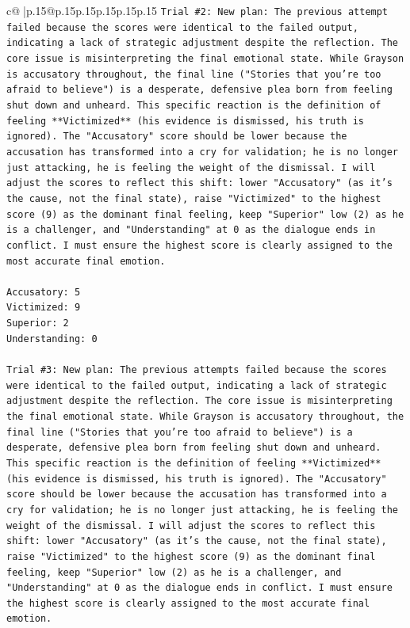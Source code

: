\documentclass{article}
\begin{document}
{\begin{supertabular}{c@{$\;$}|p{.15\linewidth}@{}p{.15\linewidth}p{.15\linewidth}p{.15\linewidth}p{.15\linewidth}p{.15\linewidth}}
{{{\texttt{Trial \#2: New plan: The previous attempt failed because the scores were identical to the failed output, indicating a lack of strategic adjustment despite the reflection. The core issue is misinterpreting the final emotional state. While Grayson is accusatory throughout, the final line ("Stories that you're too afraid to believe") is a desperate, defensive plea born from feeling shut down and unheard. This specific reaction is the definition of feeling **Victimized** (his evidence is dismissed, his truth is ignored). The "Accusatory" score should be lower because the accusation has transformed into a cry for validation; he is no longer just attacking, he is feeling the weight of the dismissal. I will adjust the scores to reflect this shift: lower "Accusatory" (as it's the cause, not the final state), raise "Victimized" to the highest score (9) as the dominant final feeling, keep "Superior" low (2) as he is a challenger, and "Understanding" at 0 as the dialogue ends in conflict. I must ensure the highest score is clearly assigned to the most accurate final emotion.} \\
\\ 
\texttt{Accusatory: 5} \\
\texttt{Victimized: 9} \\
\texttt{Superior: 2} \\
\texttt{Understanding: 0} \\
\\ 
\texttt{Trial \#3: New plan: The previous attempts failed because the scores were identical to the failed output, indicating a lack of strategic adjustment despite the reflection. The core issue is misinterpreting the final emotional state. While Grayson is accusatory throughout, the final line ("Stories that you're too afraid to believe") is a desperate, defensive plea born from feeling shut down and unheard. This specific reaction is the definition of feeling **Victimized** (his evidence is dismissed, his truth is ignored). The "Accusatory" score should be lower because the accusation has transformed into a cry for validation; he is no longer just attacking, he is feeling the weight of the dismissal. I will adjust the scores to reflect this shift: lower "Accusatory" (as it's the cause, not the final state), raise "Victimized" to the highest score (9) as the dominant final feeling, keep "Superior" low (2) as he is a challenger, and "Understanding" at 0 as the dialogue ends in conflict. I must ensure the highest score is clearly assigned to the most accurate final emotion.} \\
}}}
\end{supertabular}}
\end{document}
